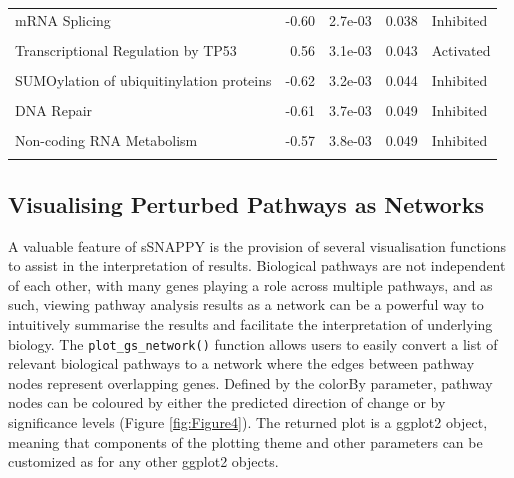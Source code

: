 \documentclass[9pt,a4paper,]{extarticle}
\begin{document}
\begin{table}
{\begin{tabular}[t]{lrrrl}
\addlinespace
mRNA Splicing & -0.60 & 2.7e-03 & 0.038 & Inhibited\\
\cellcolor{gray!6}{Polo-like kinase mediated events} & \cellcolor{gray!6}{-0.64} & \cellcolor{gray!6}{3.0e-03} & \cellcolor{gray!6}{0.042} & \cellcolor{gray!6}{Inhibited}\\
Transcriptional Regulation by TP53 & 0.56 & 3.1e-03 & 0.043 & Activated\\
\cellcolor{gray!6}{Gene expression (Transcription)} & \cellcolor{gray!6}{-0.58} & \cellcolor{gray!6}{3.2e-03} & \cellcolor{gray!6}{0.043} & \cellcolor{gray!6}{Inhibited}\\
SUMOylation of ubiquitinylation proteins & -0.62 & 3.2e-03 & 0.044 & Inhibited\\
\addlinespace
\cellcolor{gray!6}{DNA Replication} & \cellcolor{gray!6}{-0.63} & \cellcolor{gray!6}{3.4e-03} & \cellcolor{gray!6}{0.046} & \cellcolor{gray!6}{Inhibited}\\
DNA Repair & -0.61 & 3.7e-03 & 0.049 & Inhibited\\
\cellcolor{gray!6}{snRNP Assembly} & \cellcolor{gray!6}{-0.57} & \cellcolor{gray!6}{3.8e-03} & \cellcolor{gray!6}{0.049} & \cellcolor{gray!6}{Inhibited}\\
Non-coding RNA Metabolism & -0.57 & 3.8e-03 & 0.049 & Inhibited\\
\cellcolor{gray!6}{HSF1-dependent transactivation} & \cellcolor{gray!6}{0.56} & \cellcolor{gray!6}{3.9e-03} & \cellcolor{gray!6}{0.050} & \cellcolor{gray!6}{Activated}\\
\bottomrule
\end{tabular}}
\end{table}

\hypertarget{visualising-perturbed-pathways-as-networks}{%
\subsection{Visualising Perturbed Pathways as Networks}\label{visualising-perturbed-pathways-as-networks}}

A valuable feature of sSNAPPY is the provision of several visualisation functions to assist in the interpretation of results.
Biological pathways are not independent of each other, with many genes playing a role across multiple pathways, and as such, viewing pathway analysis results as a network can be a powerful way to intuitively summarise the results and facilitate the interpretation of underlying biology.
The \texttt{plot\_gs\_network()} function allows users to easily convert a list of relevant biological pathways to a network where the edges between pathway nodes represent overlapping genes.
Defined by the colorBy parameter, pathway nodes can be coloured by either the predicted direction of change or by significance levels (Figure \ref{fig:Figure4}).
The returned plot is a ggplot2 \citep{Wickham2009} object, meaning that components of the plotting theme and other parameters can be customized as for any other ggplot2 objects.
\end{document}
